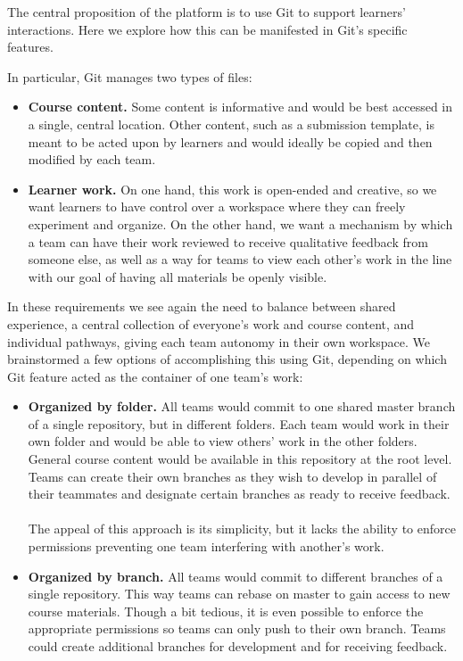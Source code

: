 \documentclass[12pt,twoside]{mitthesis}
\newcommand{\review}[1]{{\color{mygreen} #1}}
\begin{document}
\review{The central proposition of the platform is to use Git to support learners' interactions. Here we explore how this can be manifested in Git's specific features.

In particular, Git manages two types of files:
\begin{itemize}
 	\item \textbf{Course content.} Some content is informative and would be best accessed in a single, central location. Other content, such as a submission template, is meant to be acted upon by learners and would ideally be copied and then modified by each team.
 	\item \textbf{Learner work.} On one hand, this work is open-ended and creative, so we want learners to have control over a workspace where they can freely experiment and organize. On the other hand, we want a mechanism by which a team can have their work reviewed to receive qualitative feedback from someone else, as well as a way for teams to view each other's work in the line with our goal of having all materials be openly visible.
\end{itemize} 
In these requirements we see again the need to balance between shared experience, a central collection of everyone's work and course content, and individual pathways, giving each team autonomy in their own workspace. We brainstormed a few options of accomplishing this using Git, depending on which Git feature acted as the container of one team's work:
\begin{itemize}
\item \textbf{Organized by folder.} All teams would commit to one shared master branch of a single repository, but in different folders. Each team would work in their own folder and would be able to view others' work in the other folders. General course content would be available in this repository at the root level. Teams can create their own branches as they wish to develop in parallel of their teammates and designate certain branches as ready to receive feedback.\\ \\
The appeal of this approach is its simplicity, but it lacks the ability to enforce permissions preventing one team interfering with another's work.
\item \textbf{Organized by branch.} All teams would commit to different branches of a single repository. This way teams can rebase on master to gain access to new course materials. Though a bit tedious, it is even possible to enforce the appropriate permissions so teams can only push to their own branch. Teams could create additional branches for development and for receiving feedback.\\ \\

\end{itemize}}
\end{document}
